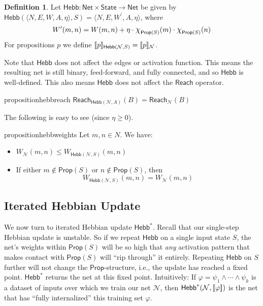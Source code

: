 \documentclass[letterpaper]{article}
\theoremstyle{definition}
\newtheorem{definition}{Definition}
\newcommand{\State}{\mathsf{State}}
\newcommand{\semantics}[1]{[\![\mbox{\em $ #1 $\/}]\!]}
\newcommand*{\bigchi}{\mbox{\Large$\chi$}}%
\newcommand{\AllNets}{\mathsf{Net}}
\newcommand{\Net}{\mathcal{N}}
\newcommand{\Prop}{\mathsf{Prop}}
\newcommand{\Reach}{\mathsf{Reach}}
\newcommand{\Hebb}[2]{\mathsf{Hebb}(#1, #2)}
\newcommand{\HebbNoArgs}{\mathsf{Hebb}}
\newcommand{\Hebbstar}[2]{\mathsf{Hebb}^*(#1, #2)}
\newcommand{\HebbstarNoArgs}{\mathsf{Hebb}^*}
\begin{document}
\begin{definition}
    Let $\HebbNoArgs : \AllNets \times \State \to \AllNets$ be given by $\Hebb{\langle N, E, W, A, \eta \rangle}{S} = \langle N, E, W^\prime, A, \eta \rangle$, where
    \[
        W^\prime(m, n) = W(m, n) + \eta \cdot \bigchi_{\Prop(S)}(m) \cdot \bigchi_{\Prop(S)}(n)
    \]
    For propositions $p$ we define $\semantics{p}_{\Hebb{\Net}{S}} = \semantics{p}_\Net$.
\end{definition}
Note that $\HebbNoArgs$ does not affect the edges or activation function.  This means the resulting net is still binary, feed-forward, and fully connected, and so $\HebbNoArgs$ is well-defined.  This also means $\HebbNoArgs$ does not affect the $\Reach$ operator.
\begin{restatable}{proposition}{hebbreach} 
    $\Reach_{\Hebb{\Net}{A}}(B) = \Reach_\Net(B)$
\end{restatable}
The following is easy to see (since $\eta \geq 0$).
\begin{restatable}{proposition}{hebbweights}
    \label{hebb_weights}
    Let $m, n \in N$.  We have:
    \begin{itemize}
        \item $W_\Net(m, n) \leq W_{\Hebb{\Net}{S}}(m, n)$
        \item If either $m \not \in \Prop(S)$ or $n \not \in \Prop(S)$, then
        \[ W_{\Hebb{\Net}{S}}(m, n) = W_\Net(m, n) \]
    \end{itemize}
\end{restatable}

\subsection{Iterated Hebbian Update}

We now turn to iterated Hebbian update $\HebbstarNoArgs$.  Recall that our single-step Hebbian update is unstable.  So if we repeat $\HebbNoArgs$ on a single input state $S$, the net's weights within $\Prop(S)$ will be so high that \emph{any} activation pattern that makes contact with $\Prop(S)$ will ``rip through'' it entirely.  Repeating $\HebbNoArgs$ on $S$ further will not change the $\Prop$-structure, i.e., the update has reached a fixed point.  $\HebbstarNoArgs$ returns the net at this fixed point.  Intuitively: If $\varphi = \psi_1 \land \cdots \land \psi_k$ is a dataset of inputs over which we train our net $\Net$, then $\Hebbstar{\Net}{\semantics{\varphi}}$ is the net that has ``fully internalized'' this training set $\varphi$.
\end{document}
